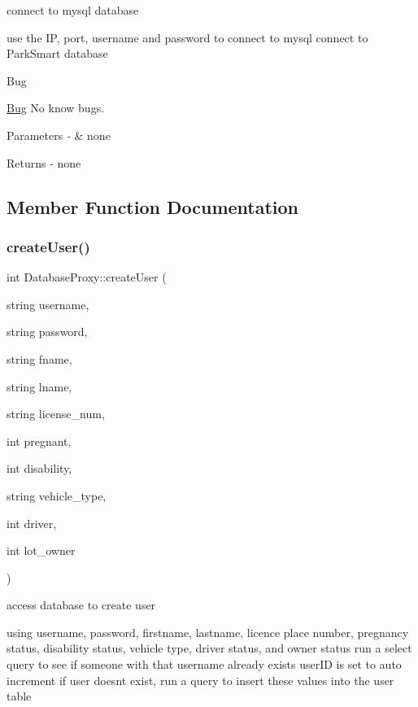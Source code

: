 connect to mysql database 

use the IP, port, username and password to connect to mysql connect to Park\+Smart database

\begin{DoxyRefDesc}{Bug}
\item[\mbox{\hyperlink{bug__bug000009}{Bug}}]No know bugs. \end{DoxyRefDesc}

\begin{DoxyParams}{Parameters}
{\em -\/} & none \\
\hline
\end{DoxyParams}
\begin{DoxyReturn}{Returns}
-\/ none 
\end{DoxyReturn}


\subsection{Member Function Documentation}
\mbox{\label{class_database_proxy_abe0e5778383920086854c194b3802f61}} 
\subsubsection{\texorpdfstring{create\+User()}{createUser()}}
{\footnotesize\ttfamily int Database\+Proxy\+::create\+User (\begin{DoxyParamCaption}\item[{string}]{username,  }\item[{string}]{password,  }\item[{string}]{fname,  }\item[{string}]{lname,  }\item[{string}]{license\+\_\+num,  }\item[{int}]{pregnant,  }\item[{int}]{disability,  }\item[{string}]{vehicle\+\_\+type,  }\item[{int}]{driver,  }\item[{int}]{lot\+\_\+owner }\end{DoxyParamCaption})}



access database to create user 

using username, password, firstname, lastname, licence place number, pregnancy status, disability status, vehicle type, driver status, and owner status run a select query to see if someone with that username already exists user\+ID is set to auto increment if user doesnt exist, run a query to insert these values into the user table

